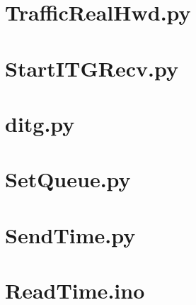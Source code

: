 \documentclass[12pt, a4paper, twoside, openright]{ociamthesis}  %
\begin{document}
\section{Traffic\textunderscore Real\textunderscore Hwd.py}\label{Traffic_Real_Hwd}

\section{Start\textunderscore ITGRecv.py}\label{Start_ITGRecv}

\section{ditg.py}\label{ditg_RLNT}

\section{Set\textunderscore Queue.py}\label{Set_Queue}

\section{SendTime.py}\label{SendTime}

\section{ReadTime.ino}\label{ReadTime}

\end{document}
